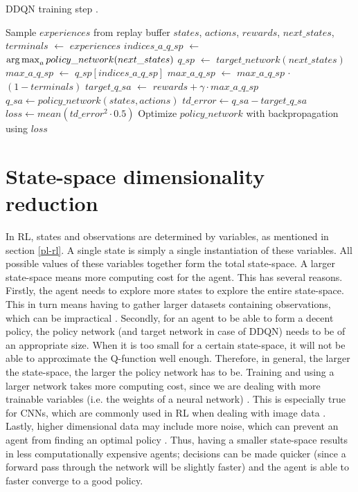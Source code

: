 \begin{algorithm}
\caption{DDQN training step \cite[p.299]{grokking}.}
\label{alg:ddqn}
\begin{algorithmic}[1]
\State Sample $experiences$ from replay buffer
\State $states$, $actions$, $rewards$, $next\_states$, $terminals$ $\gets$ $experiences$
\State $indices\_a\_q\_sp$ $\gets$ $\operatorname*{arg\,max}_a policy\_ network(next\_states)$
\State $q\_sp$ $\gets$ $target\_network(next\_states)$
\State $max\_a\_q\_sp$ $\gets$ $q\_sp[indices\_a\_q\_sp]$
\State $max\_a\_q\_sp$ $\gets$ $max\_a\_q\_sp$ $\cdot$ $(1-terminals)$ 
\State $target\_q\_sa$ $\gets$ $rewards + \gamma \cdot max\_a\_q\_sp$
\State $q\_sa \gets policy\_network(states, actions)$
\State $td\_error \gets q\_sa - target\_q\_sa$
\State $loss \gets mean(td\_error^2 \cdot 0.5)$
\State Optimize $policy\_network$ with backpropagation using $loss$
\end{algorithmic}
\end{algorithm}

\section{State-space dimensionality reduction}\label{pl-dimensionality}
In RL, states and observations are determined by variables, as mentioned in section \ref{pl-rl}. A single state is simply a single instantiation of these variables. All possible values of these variables together form the total state-space. A larger state-space means more computing cost for the agent. This has several reasons. Firstly, the agent needs to explore more states to explore the entire state-space. This in turn means having to gather larger datasets containing observations, which can be impractical \cite{AE_2019}. Secondly, for an agent to be able to form a decent policy, the policy network (and target network in case of DDQN) needs to be of an appropriate size. When it is too small for a certain state-space, it will not be able to approximate the Q-function well enough. Therefore, in general, the larger the state-space, the larger the policy network has to be. Training and using a larger network takes more computing cost, since we are dealing with more trainable variables (i.e. the weights of a neural network) \cite{AE_2019}. This is especially true for CNNs, which are commonly used in RL when dealing with image data \cite{CNN_computation}. Lastly, higher dimensional data may include more noise, which can prevent an agent from finding an optimal policy \cite{AE_2016}. Thus, having a smaller state-space results in less computationally expensive agents; decisions can be made quicker (since a forward pass through the network will be slightly faster) and the agent is able to faster converge to a good policy. 

